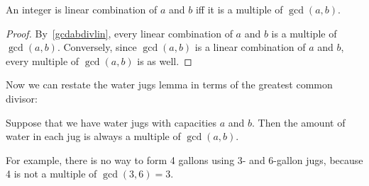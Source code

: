 \begin{editingnotes}
\begin{corollary}\label{cor:lin-comb-edit}
An integer is linear combination of $a$ and $b$ iff it is a multiple
of $\gcd(a, b)$.
\end{corollary}

\begin{proof} By~\eqref{gcdabdivlin}, every linear combination of $a$ and $b$ is a
multiple of $\gcd(a, b)$.  Conversely, since $\gcd(a, b)$ is a linear
combination of $a$ and $b$, every multiple of $\gcd(a, b)$ is as
well.  \end{proof}

Now we can restate the water jugs lemma in terms of the greatest
common divisor:

\begin{corollary} \label{cor:waterjugs_note} Suppose that we have water jugs with
capacities $a$ and $b$.  Then the amount of water in each jug is
always a multiple of $\gcd(a, b)$.
\end{corollary}

For example, there is no way to form 4 gallons using 3- and 6-gallon
jugs, because 4 is not a multiple of $\gcd(3, 6) = 3$.

\end{editingnotes}
\fi
